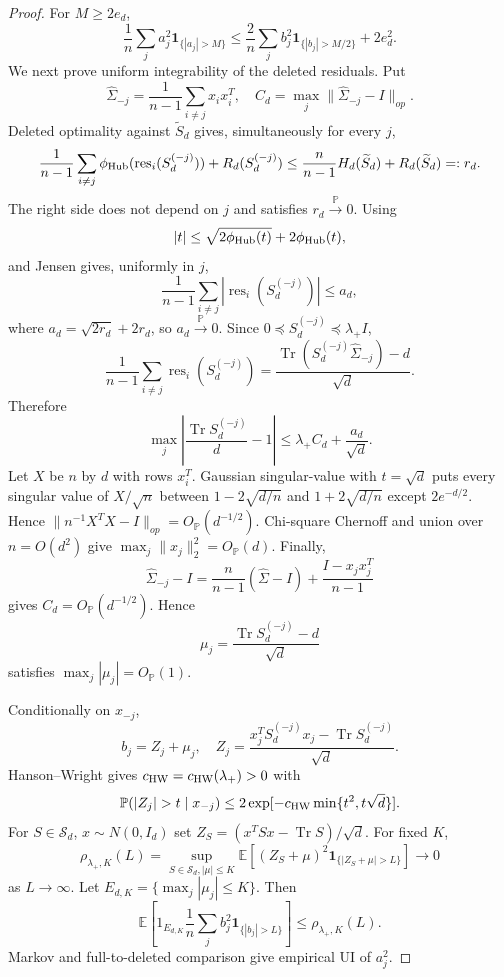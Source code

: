 \documentclass[11pt]{article}
\numberwithin{equation}{section}
\theoremstyle{definition}
\theoremstyle{remark}
\newcommand{\E}{\mathbb E}
\newcommand{\Pp}{\mathbb P}
\newcommand{\1}{\boldsymbol 1}
\newcommand{\res}{\operatorname{res}}
\newcommand{\rentry}[1]{\res_{#1}}
\begin{document}
\begin{aiblock}
\begin{proof}
  For $M\ge2e_d$,
  \[
    \frac1n\sum_j a_j^2\mathbf1_{\{|a_j|>M\}}
    \le\frac2n\sum_j b_j^2\mathbf1_{\{|b_j|>M/2\}}+2e_d^2.
  \]
  We next prove uniform integrability of the
  deleted residuals. Put
  \[
    \widehat\Sigma_{-j}=\frac1{n-1}\sum_{i\ne j}x_ix_i^T,
    \quad C_d=\max_j\|\widehat\Sigma_{-j}-I\|_{op}.
  \]
  Deleted optimality against $\widetilde S_d$ gives,
  simultaneously for every $j$,
  \[
    \frac1{n-1}\sum_{i\ne j}\phi_{\rm Hub}(\rentry{i}(S_d^{(-j)}))
    +R_d(S_d^{(-j)})
    \le\frac{n}{n-1}H_d(\widetilde S_d)+R_d(\widetilde S_d)=:r_d.
  \]
  The right side does not depend on $j$ and satisfies
  $r_d\xrightarrow{\Pp}0$. Using
  \[
    |t|\le\sqrt{2\phi_{\rm Hub}(t)}+2\phi_{\rm Hub}(t),
  \]
  and Jensen gives, uniformly in $j$,
  \[
    \frac1{n-1}\sum_{i\ne j}|\rentry{i}(S_d^{(-j)})|\le a_d,
  \]
  where $a_d=\sqrt{2r_d}+2r_d$, so $a_d\xrightarrow{\Pp}0$.
  Since $0\preceq S_d^{(-j)}\preceq\lambda_+I$,
  \[
    \frac1{n-1}\sum_{i\ne j}\rentry{i}(S_d^{(-j)})
    =\frac{\operatorname{Tr}(S_d^{(-j)}\widehat\Sigma_{-j})-d}{\sqrt d}.
  \]
  Therefore
  \[
    \max_j\left|\frac{\operatorname{Tr}S_d^{(-j)}}{d}-1\right|
    \le\lambda_+C_d+\frac{a_d}{\sqrt d}.
  \]
  Let $X$ be $n$ by $d$ with rows $x_i^T$. Gaussian
  singular-value \cite[Thm II.13]{DavidsonSzarek2001}
  with $t=\sqrt d$ puts every singular value of
  $X/\sqrt n$ between $1-2\sqrt{d/n}$ and
  $1+2\sqrt{d/n}$ except $2e^{-d/2}$. Hence
  $\|n^{-1}X^TX-I\|_{op}=O_{\Pp}(d^{-1/2})$. Chi-square
  Chernoff and union over $n=O(d^2)$ give
  $\max_j\|x_j\|_2^2=O_{\Pp}(d)$. Finally,
  \[
    \widehat\Sigma_{-j}-I=\frac{n}{n-1}(\widehat\Sigma-I)
    +\frac{I-x_jx_j^T}{n-1}
  \]
  gives $C_d=O_{\Pp}(d^{-1/2})$. Hence
  \[
    \mu_j=\frac{\operatorname{Tr}S_d^{(-j)}-d}{\sqrt d}
  \]
  satisfies $\max_j|\mu_j|=O_{\Pp}(1)$.

  Conditionally on $x_{-j}$,
  \[
    b_j=Z_j+\mu_j,\quad
    Z_j=\frac{x_j^TS_d^{(-j)}x_j-\operatorname{Tr}S_d^{(-j)}}{\sqrt d}.
  \]
  Hanson--Wright \cite[Thm 1.1]{RudelsonVershynin2013}
  gives $c_{\rm HW}=c_{\rm HW}(\lambda_+)>0$ with
  \[
    \Pp(|Z_j|>t\mid x_{-j})\le2\exp[-c_{\rm HW}\min\{t^2,t\sqrt d\}].
  \]
  For $S\in\mathcal S_d$, $x\sim N(0,I_d)$ set
  $Z_S=(x^TSx-\operatorname{Tr}S)/\sqrt d$. For fixed $K$,
  \[
    \rho_{\lambda_+,K}(L)=\sup_{S\in\mathcal S_d,|\mu|\le K}
    \E[(Z_S+\mu)^2\mathbf1_{\{|Z_S+\mu|>L\}}]\to0
  \]
  as $L\to\infty$. Let $E_{d,K}=\{\max_j|\mu_j|\le K\}$.
  Then
  \[
    \E\left[1_{E_{d,K}}\frac1n\sum_j b_j^2\mathbf1_{\{|b_j|>L\}}\right]
    \le\rho_{\lambda_+,K}(L).
  \]
  Markov and full-to-deleted comparison give empirical
  UI of $a_j^2$.


\end{proof}
\end{aiblock}
\end{document}
